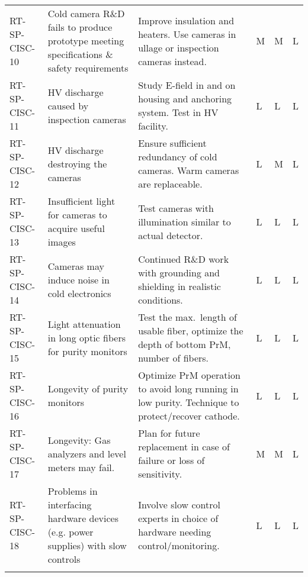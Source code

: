 \begin{longtable}{p{}p{}p{}p{}p{}p{}}
RT-SP-CISC-10 & Cold camera R\&D fails to produce prototype meeting specifications \& safety requirements & Improve insulation and heaters. Use cameras in ullage or inspection cameras instead. & M & M & L \\  \colhline
RT-SP-CISC-11 & HV discharge caused by inspection cameras & Study E-field in and on housing and anchoring system. Test in HV facility. & L & L & L \\  \colhline
RT-SP-CISC-12 & HV discharge destroying the cameras & Ensure sufficient redundancy of cold cameras. Warm cameras are replaceable. & L & M & L \\  \colhline
RT-SP-CISC-13 & Insufficient light for cameras to acquire useful images & Test cameras with illumination similar to actual detector. & L & L & L \\  \colhline
RT-SP-CISC-14 & Cameras may induce noise in cold electronics & Continued R\&D work with grounding and shielding in realistic conditions. & L & L & L \\  \colhline
RT-SP-CISC-15 & Light attenuation in long optic fibers for purity monitors  & Test the max.\ length of usable fiber, optimize the depth of bottom PrM, number of fibers. & L & L & L \\  \colhline
RT-SP-CISC-16 & Longevity of purity monitors & Optimize PrM operation to avoid long running in low purity. Technique to protect/recover cathode. & L & L & L \\  \colhline
RT-SP-CISC-17 & Longevity: Gas analyzers and level meters may fail. & Plan for future replacement in case of failure or loss of sensitivity.  & M & M & L \\  \colhline
RT-SP-CISC-18 & Problems in interfacing  hardware devices (e.g. power supplies) with slow controls & Involve slow control experts in choice of hardware needing control/monitoring.
 & L & L & L \\  \colhline

\label{tab:risks:SP-FD-CISC}
\end{longtable}